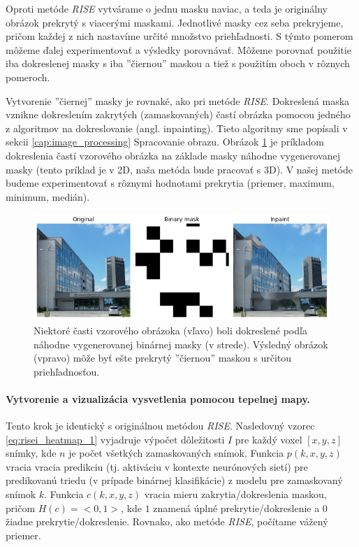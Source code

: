 Oproti metóde \textit{RISE} vytvárame o jednu masku naviac, a teda je originálny obrázok prekrytý s viacerými maskami. Jednotlivé masky cez seba prekryjeme, pričom každej z nich nastavíme určité množstvo priehľadnosti. S týmto pomerom môžeme ďalej experimentovať a výsledky porovnávať. Môžeme porovnať použitie iba dokreslenej masky s iba ''čiernou'' maskou a tiež s použitím oboch v rôznych pomeroch.

Vytvorenie ''čiernej'' masky je rovnaké, ako pri metóde \textit{RISE}. Dokreslená maska vznikne dokreslením zakrytých (zamaskovaných) častí obrázka pomocou jedného z algoritmov na dokreslovanie (angl. inpainting). Tieto algoritmy sme popísali v sekcii \ref{cap:image_processing} Spracovanie obrazu. Obrázok \ref{fig:risei_inpainting_example} je príkladom dokreslenia častí vzorového obrázka na základe masky náhodne vygenerovanej masky (tento príklad je v 2D, naša metóda bude pracovať s 3D). V našej metóde budeme experimentovať s rôznymi hodnotami prekrytia (priemer, maximum, minimum, medián).

\begin{figure}[h!]
    \centering
    \includegraphics[width=13cm]{assets/images/risei_inpainting_example.png}
    \caption{Niektoré časti vzorového obrázoka (vľavo) boli dokreslené podľa náhodne vygenerovanej binárnej masky (v strede). Výsledný obrázok (vpravo) môže byť ešte prekrytý ''čiernou'' maskou s určitou priehľadnosťou.}
    \label{fig:risei_inpainting_example}
\end{figure}

\paragraph{Vytvorenie a vizualizácia vysvetlenia pomocou tepelnej mapy.}

Tento krok je identický s originálnou metódou \textit{RISE}. Nasledovný vzorec \ref{eq:risei_heatmap_1} vyjadruje výpočet dôležitosti $I$ pre každý voxel $[x, y, z]$ snímky, kde $n$ je počet všetkých zamaskovaných snímok. Funkcia $p(k, x, y, z)$ vracia vracia predikciu (tj. aktiváciu v kontexte neurónových sietí) pre predikovanú triedu (v prípade binárnej klasifikácie) z modelu pre zamaskovaný snímok $k$. Funkcia $c(k, x, y, z)$ vracia mieru zakrytia/dokreslenia maskou, pričom $H(c) = <0, 1>$, kde $1$ znamená úplné prekrytie/dokreslenie a $0$ žiadne prekrytie/dokreslenie. Rovnako, ako metóde \textit{RISE}, počítame vážený priemer.

